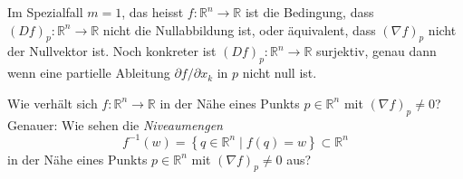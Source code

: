 \documentclass[../main.tex]{subfiles}
\begin{document}
Im Spezialfall $m = 1$, das heisst $f \colon \mathbb{R}^n \to \mathbb{R}$ 
ist die Bedingung, dass ${(Df)}_p \colon \mathbb{R}^n \to \mathbb{R}$
nicht die Nullabbildung ist, oder äquivalent, dass
${(\nabla f)}_p$ nicht der Nullvektor ist.
Noch konkreter ist $({Df})_p \colon \mathbb{R}^n \to \mathbb{R}$
surjektiv, genau dann wenn eine partielle Ableitung $\partial f / \partial x_k$
in $p$ nicht null ist.

\begin{question}
  Wie verhält sich $f \colon \mathbb{R}^n \to \mathbb{R}$ 
  in der Nähe eines Punkts $p \in \mathbb{R}^n$ mit
  ${(\nabla f)}_p \neq 0$? Genauer: Wie sehen die 
  \emph{Niveaumengen}
  \[
    f^{-1}(w) = \left\{q \in \mathbb{R}^n \mid f(q) = w\right\}
    \subset \mathbb{R}^n
  \]
  in der Nähe eines Punkts $p \in \mathbb{R}^n$ 
  mit ${(\nabla f)}_p \neq 0$ aus?
\end{question}
\end{document}
